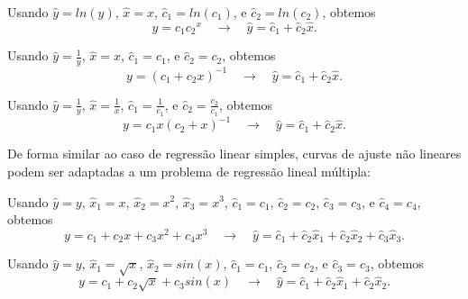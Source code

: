 \begin{example}%
Usando 
$\hat{y}=ln(y)$,  
$\hat{x}=x$, 
$\hat{c}_1=ln(c_1)$, e
$\hat{c}_2=ln(c_2)$, obtemos %
\begin{equation}
y=c_1 {c_2}^x
\quad \rightarrow \quad 
\hat{y}=\hat{c}_1+\hat{c}_2 \hat{x}.
\end{equation}
\vspace{-2pt}
\end{example}

\begin{example}%
Usando 
$\hat{y}=\frac{1}{y}$,  
$\hat{x}=x$, 
$\hat{c}_1=c_1$, e 
$\hat{c}_2=c_2$, obtemos %
\begin{equation}
y=\left(c_1 + {c_2} x \right)^{-1}
\quad \rightarrow \quad 
\hat{y}=\hat{c}_1+\hat{c}_2 \hat{x}.
\end{equation}
\vspace{-2pt}
\end{example}

\begin{example}%
Usando 
$\hat{y}=\frac{1}{y}$,  
$\hat{x}=\frac{1}{x}$, 
$\hat{c}_1=\frac{1}{c_1}$, e 
$\hat{c}_2=\frac{c_2}{c_1}$, obtemos %
\begin{equation}
y=c_1 x \left(c_2 + x\right)^{-1}
\quad \rightarrow \quad 
\hat{y}=\hat{c}_1+\hat{c}_2 \hat{x}.
\end{equation}
\vspace{-2pt}
\end{example}

De forma similar ao caso de regressão linear simples,
curvas de ajuste não lineares podem ser adaptadas a um problema de regressão lineal múltipla:
\begin{example}%
Usando 
$\hat{y}=y$,  
$\hat{x}_1=x$,
$\hat{x}_2=x^2$,
$\hat{x}_3=x^3$, 
$\hat{c}_1=c_1$, 
$\hat{c}_2=c_2$, 
$\hat{c}_3=c_3$, e 
$\hat{c}_4=c_4$, obtemos %
\begin{equation}
y=c_1 +c_2 x + c_3 x^2 + c_4 x^3
\quad \rightarrow \quad 
\hat{y}=\hat{c}_1+\hat{c}_2 \hat{x}_1+\hat{c}_2 \hat{x}_2+\hat{c}_3 \hat{x}_3.
\end{equation}
\vspace{-2pt}
\end{example}

\begin{example}%
Usando 
$\hat{y}=y$,  
$\hat{x}_1=\sqrt{x}$,
$\hat{x}_2=sin(x)$, 
$\hat{c}_1=c_1$, 
$\hat{c}_2=c_2$, e 
$\hat{c}_3=c_3$, obtemos %
\begin{equation}
y=c_1 +c_2 \sqrt{x} + c_3 sin(x)
\quad \rightarrow \quad 
\hat{y}=\hat{c}_1+\hat{c}_2 \hat{x}_1+\hat{c}_2 \hat{x}_2.
\end{equation}
\vspace{-2pt}
\end{example}
